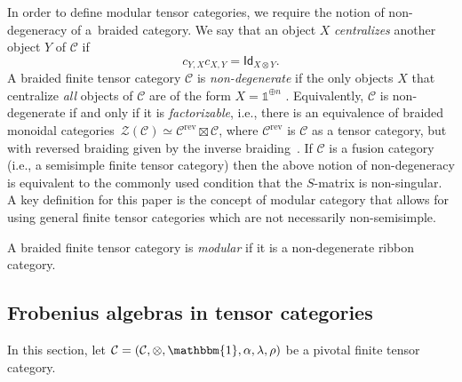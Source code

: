 \documentclass[pdftex]{sigma}
\numberwithin{equation}{section}
\newcommand{\ide}{\mathsf{Id}}
\newcommand{\one}{\mathds{1}}
\newcommand{\rev}{\mathrm{rev}}
\newcommand{\cC}{\mathcal{C}}
\newcommand{\cZ}{\mathcal{Z}}
\begin{document}
In order to define modular tensor categories, we require the notion of non-degeneracy of a~braided category. We say that an object $X$ \emph{centralizes} another object $Y$ of $\cC$ if
\[c_{Y,X}c_{X,Y}=\ide_{X\otimes Y}.\]
A braided finite tensor category $\cC$ is \emph{non-degenerate} if the only objects $X$ that centralize \emph{all} objects of $\cC$ are of the form $X=\one^{\oplus n}$ \cite[Section~8.20]{EGNO}.
Equivalently, $\cC$ is non-degenerate if and only if it is \emph{factorizable}, i.e., there is an equivalence of braided monoidal categories~$\cZ(\cC)\simeq \cC^{\rev}\boxtimes\cC$, where $\cC^\rev$ is $\cC$ as a tensor category, but with reversed braiding given by the inverse braiding~\cite{Shi1}. If $\cC$ is a fusion category (i.e., a semisimple finite tensor category) then the above notion of non-degeneracy is equivalent to the commonly used condition that the $S$-matrix is non-singular.
A key definition for this paper is the concept of modular category that allows for using general finite tensor categories which are not necessarily non-semisimple.

\begin{Definition}
A braided finite tensor category is \emph{modular} if it is a non-degenerate ribbon category.
\end{Definition}

\subsection{Frobenius algebras in tensor categories}

In this section, let $\cC=( \cC,\otimes, \mathbbm{1},\alpha,\lambda,\rho)$ be a pivotal finite tensor category.
\end{document}
